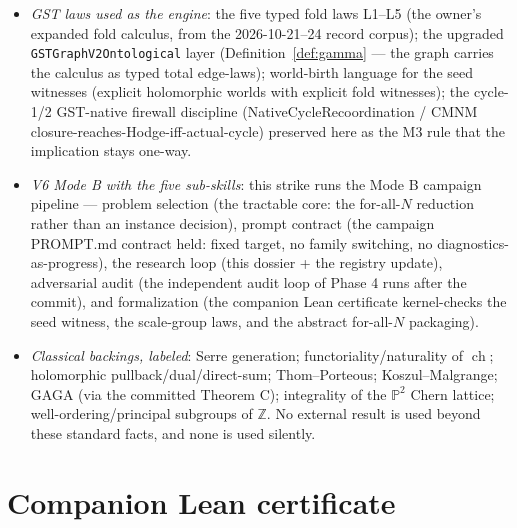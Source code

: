 \documentclass[11pt]{article}
\newcommand{\ch}{\operatorname{ch}}
\newcommand{\Z}{\mathbb{Z}}
\newcommand{\Pp}{\mathbb{P}}
\begin{document}
\begin{itemize}
\item \emph{GST laws used as the engine}: the five typed fold laws L1--L5
(the owner's expanded fold calculus, from the 2026-10-21--24 record corpus);
the upgraded \texttt{GSTGraphV2Ontological} layer (Definition~\ref{def:gamma}
--- the graph carries the calculus as typed total edge-laws); world-birth
language for the seed witnesses (explicit holomorphic worlds with explicit
fold witnesses); the cycle-1/2 GST-native firewall discipline
(NativeCycleRecoordination / CMNM closure-reaches-Hodge-iff-actual-cycle)
preserved here as the M3 rule that the implication stays one-way.
\item \emph{V6 Mode B with the five sub-skills}: this strike runs the Mode B
campaign pipeline --- problem selection (the tractable core: the for-all-$N$
reduction rather than an instance decision), prompt contract (the campaign
PROMPT.md contract held: fixed target, no family switching, no
diagnostics-as-progress), the research loop (this dossier + the registry
update), adversarial audit (the independent audit loop of Phase 4 runs after
the commit), and formalization (the companion Lean certificate
kernel-checks the seed witness, the scale-group laws, and the abstract
for-all-$N$ packaging).
\item \emph{Classical backings, labeled}: Serre generation;
functoriality/naturality of $\ch$; holomorphic pullback/dual/direct-sum;
Thom--Porteous; Koszul--Malgrange; GAGA (via the committed Theorem C);
integrality of the $\Pp^2$ Chern lattice; well-ordering/principal subgroups
of $\Z$.  No external result is used beyond these standard facts, and none
is used silently.
\end{itemize}

\section{Companion Lean certificate}
\label{sec:lean}
\end{document}

